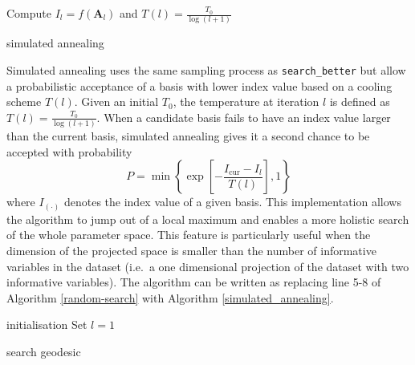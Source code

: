 \documentclass[12pt]{article}
\begin{document}
\begin{algorithm}
\SetAlgoLined
    Compute $I_{l} = f(\mathbf{A}_{l})$ and $T(l) = \frac{T_0}{\log(l + 1)}$\;
  \caption{simulated annealing}
  \label{simulated_annealing}
\end{algorithm}

Simulated annealing \citep[\citet{bertsimas1993simulated}]{kirkpatrick1983optimization} uses the same sampling process as \texttt{search\_better} but allow a probabilistic acceptance of a basis with lower index value based on a cooling scheme \(T(l)\). Given an initial \(T_0\), the temperature at iteration \(l\) is defined as \(T(l) = \frac{T_0}{\log(l + 1)}\). When a candidate basis fails to have an index value larger than the current basis, simulated annealing gives it a second chance to be accepted with probability \[P= \min\left\{\exp\left[-\frac{I_{\text{cur}} - I_{l}}{T(l)}\right],1\right\}\] where \(I_{(\cdot)}\) denotes the index value of a given basis. This implementation allows the algorithm to jump out of a local maximum and enables a more holistic search of the whole parameter space. This feature is particularly useful when the dimension of the projected space is smaller than the number of informative variables in the dataset (i.e.~a one dimensional projection of the dataset with two informative variables). The algorithm can be written as replacing line 5-8 of Algorithm \ref{random-search} with Algorithm \ref{simulated_annealing}.

\begin{algorithm}
\SetAlgoLined
{}
  initialisation\;
  Set $l = 1$\;
  \caption{search geodesic}
  \label{search-geodesic}
\end{algorithm}
\end{document}
